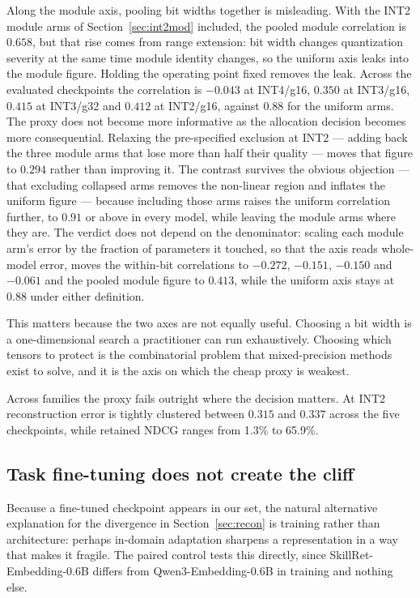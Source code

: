 \documentclass[11pt]{article}
\begin{document}
Along the module axis, pooling bit widths together is misleading. With the INT2 module arms of
Section~\ref{sec:int2mod} included, the pooled module correlation is $0.658$, but that rise
comes from range extension: bit width changes quantization severity at the same time module
identity changes, so the uniform axis leaks into the module figure. Holding the operating point
fixed removes the leak. Across the evaluated checkpoints the correlation is $-0.043$ at
INT4/g16, $0.350$ at INT3/g16, $0.415$ at INT3/g32 and $0.412$ at INT2/g16, against $0.88$ for
the uniform arms. The proxy does not become more informative as the allocation decision becomes
more consequential. Relaxing the \mbox{pre-specified} exclusion at INT2 --- adding back the three
module arms that lose more than half their quality --- moves that figure to $0.294$ rather than
improving it. The contrast survives the
obvious objection --- that excluding collapsed arms removes the non-linear region and
inflates the uniform figure --- because including those arms raises the uniform correlation
further, to $0.91$ or above in every model, while leaving the module arms where they are. The verdict does not depend on the denominator: scaling each module arm's error by the
fraction of parameters it touched, so that the axis reads whole-model error, moves the
within-bit correlations to $-0.272$, $-0.151$, $-0.150$ and $-0.061$ and the pooled module
figure to $0.413$, while the uniform axis stays at $0.88$ under either definition.

This matters because the two axes are not equally useful. Choosing a bit width is a
one-dimensional search a practitioner can run exhaustively. Choosing which tensors to protect
is the combinatorial problem that mixed-precision methods exist to solve, and it is the axis
on which the cheap proxy is weakest.

Across families the proxy fails outright where the decision matters. At INT2 reconstruction error is tightly
clustered between $0.315$ and $0.337$ across the five checkpoints, while retained NDCG ranges
from 1.3\% to 65.9\%.

\subsection{Task fine-tuning does not create the cliff}
\label{sec:paired}

Because a fine-tuned checkpoint appears in our set, the natural alternative explanation for
the divergence in Section~\ref{sec:recon} is training rather than architecture: perhaps
in-domain adaptation sharpens a representation in a way that makes it fragile. The paired
control tests this directly, since SkillRet-Embedding-0.6B differs from
Qwen3-Embedding-0.6B in training and nothing else.
\end{document}
